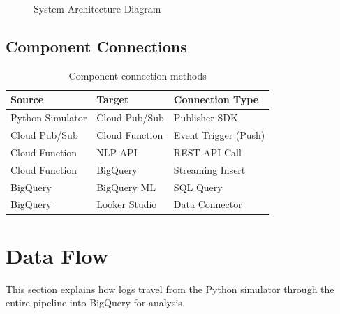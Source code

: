 \documentclass[12pt,a4paper]{article}
\begin{document}
\begin{figure}[H]
{
}
\caption{System Architecture Diagram}
\label{fig:architecture}
\end{figure}


\subsection{Component Connections}

\begin{table}[H]
\centering
\begin{tabular}{|l|l|l|}
\hline
\textbf{Source} & \textbf{Target} & \textbf{Connection Type} \\
\hline
Python Simulator & Cloud Pub/Sub & Publisher SDK \\
\hline
Cloud Pub/Sub & Cloud Function & Event Trigger (Push) \\
\hline
Cloud Function & NLP API & REST API Call \\
\hline
Cloud Function & BigQuery & Streaming Insert \\
\hline
BigQuery & BigQuery ML & SQL Query \\
\hline
BigQuery & Looker Studio & Data Connector \\
\hline
\end{tabular}
\caption{Component connection methods}
\end{table}

\section{Data Flow}

This section explains how logs travel from the Python simulator through the entire pipeline into BigQuery for analysis.
\end{document}
